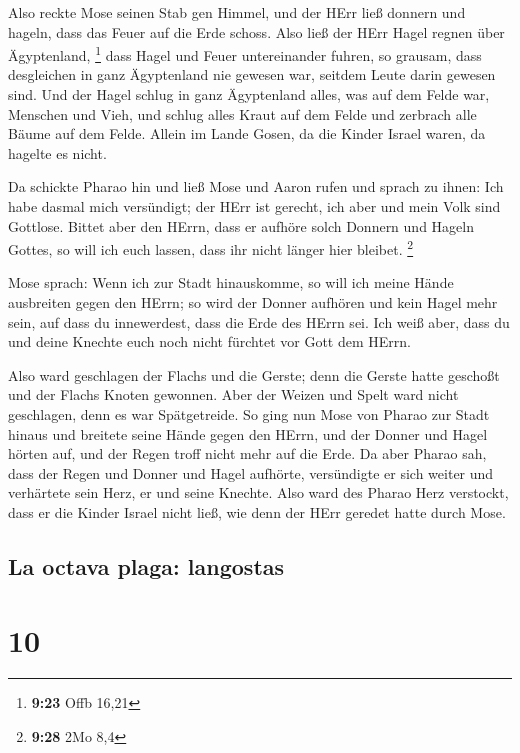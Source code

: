  Also reckte Mose seinen Stab gen Himmel, und der HErr
ließ donnern und hageln, dass das Feuer auf die Erde schoss. Also ließ
der HErr Hagel regnen über Ägyptenland, \footnote{\textbf{9:23} Offb
  16,21}  dass Hagel und Feuer untereinander fuhren, so
grausam, dass desgleichen in ganz Ägyptenland nie gewesen war, seitdem
Leute darin gewesen sind.  Und der Hagel schlug in ganz
Ägyptenland alles, was auf dem Felde war, Menschen und Vieh, und schlug
alles Kraut auf dem Felde und zerbrach alle Bäume auf dem Felde.
 Allein im Lande Gosen, da die Kinder Israel waren, da
hagelte es nicht.

 Da schickte Pharao hin und ließ Mose und Aaron rufen und
sprach zu ihnen: Ich habe dasmal mich versündigt; der HErr ist gerecht,
ich aber und mein Volk sind Gottlose.  Bittet aber den
HErrn, dass er aufhöre solch Donnern und Hageln Gottes, so will ich euch
lassen, dass ihr nicht länger hier bleibet. \footnote{\textbf{9:28} 2Mo
  8,4}

 Mose sprach: Wenn ich zur Stadt hinauskomme, so will ich
meine Hände ausbreiten gegen den HErrn; so wird der Donner aufhören und
kein Hagel mehr sein, auf dass du innewerdest, dass die Erde des HErrn
sei.  Ich weiß aber, dass du und deine Knechte euch noch
nicht fürchtet vor Gott dem HErrn.

 Also ward geschlagen der Flachs und die Gerste; denn die
Gerste hatte geschoßt und der Flachs Knoten gewonnen. 
Aber der Weizen und Spelt ward nicht geschlagen, denn es war
Spätgetreide.  So ging nun Mose von Pharao zur Stadt
hinaus und breitete seine Hände gegen den HErrn, und der Donner und
Hagel hörten auf, und der Regen troff nicht mehr auf die Erde.
 Da aber Pharao sah, dass der Regen und Donner und Hagel
aufhörte, versündigte er sich weiter und verhärtete sein Herz, er und
seine Knechte.  Also ward des Pharao Herz verstockt, dass
er die Kinder Israel nicht ließ, wie denn der HErr geredet hatte durch
Mose.

\hypertarget{la-octava-plaga-langostas}{%
\subsection{La octava plaga:
langostas}\label{la-octava-plaga-langostas}}

\hypertarget{section-9}{%
\section{10}\label{section-9}}

